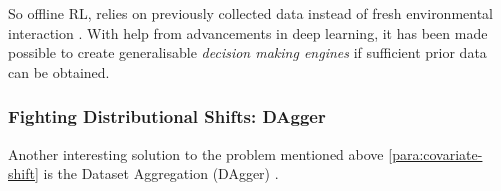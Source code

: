 So offline RL, relies on previously collected data instead of fresh environmental interaction \cite{levine2020offlinereinforcementlearningtutorial}. With help from advancements in deep learning, it has been made possible to create generalisable \emph{decision making engines} \cite{levine2020offlinereinforcementlearningtutorial} if sufficient prior data can be obtained.

\subsubsection{Fighting Distributional Shifts: DAgger}
Another interesting solution to the problem mentioned above \ref{para:covariate-shift} is the Dataset Aggregation (DAgger) \cite{ross2011reductionimitationlearningstructured}. 